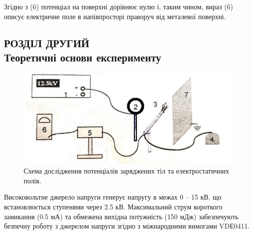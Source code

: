 \documentclass[a4paper,12pt]{article}
\begin{document}
	Згідно з (6) потенціал на поверхні дорівнює нулю і, таким чином, вираз (6) описує електричне поле в напівпросторі праворуч від металевої поверхні.
	
	
	
\newpage
	\begin{center}
		\section* {РОЗДІЛ ДРУГИЙ\\Теоретичні основи експерименту}
	\end{center}
	\begin{figure}[h!]
		\begin{center}
			\includegraphics[scale=0.8]{Prt sc/Shema_2.jpg}
		\end{center}
		\caption{Схема дослідження потенціалів заряджених тіл та електростатичних полів.}
		\label{Picture_2}
	\end{figure}

	Високовольтне джерело напруги генерує напругу в межах 0 – 15 кВ, що встановлюється ступенями через 2.5 кВ. Максимальний струм короткого замикання (0.5 мА) та обмежена вихідна потужність (150 мДж) забезпечують безпечну роботу з джерелом напруги згідно з міжнародними вимогами VDЕ0411.
	
\end{document}
